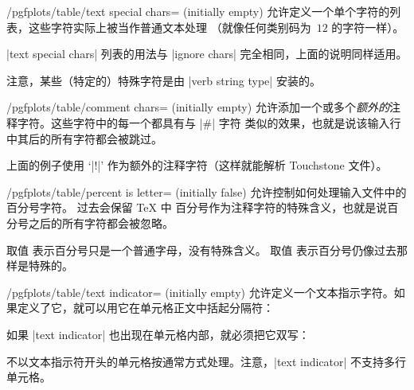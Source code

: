 \documentclass[a4paper,doc2]{ltxdoc}
\begin{document}
\begin{key}{/pgfplots/table/text special chars= (initially empty)}
    允许定义一个单个字符的列表，这些字符实际上被当作普通文本处理
    （就像任何类别码为~$12$ 的字符一样）。

    |text special chars| 列表的用法与 |ignore chars| 完全相同，上面的说明同样适用。

    注意，某些（特定的）特殊字符是由 |verb string type| 安装的。
\begin{codeexample}[]
\end{codeexample}
\end{key}

\begin{key}{/pgfplots/table/comment chars= (initially empty)}
    允许添加一个或多个\emph{额外的}注释字符。这些字符中的每一个都具有与 |#| 字符
    类似的效果，也就是说该输入行中其后的所有字符都会被跳过。
\begin{codeexample}[]
\end{codeexample}
    上面的例子使用 `|!|' 作为额外的注释字符（这样就能解析 Touchstone 文件）。
\end{key}

\begin{key}{/pgfplots/table/percent is letter= (initially false)}
    允许控制如何处理输入文件中的百分号字符。\PGFPlotstable{} 过去会保留 \TeX{} 中
    百分号作为注释字符的特殊含义，也就是说百分号之后的所有字符都会被忽略。

    取值  表示百分号只是一个普通字母，没有特殊含义。
    取值  表示百分号仍像过去那样是特殊的。
\end{key}

\begin{key}{/pgfplots/table/text indicator= (initially empty)}
    允许定义一个文本指示字符。如果定义了它，就可以用它在单元格正文中括起分隔符：
\begin{codeexample}[]
\end{codeexample}

    如果 |text indicator| 也出现在单元格内部，就必须把它双写：
\begin{codeexample}[]
\end{codeexample}

    不以文本指示符开头的单元格按通常方式处理。注意，|text indicator| 不支持多行单元格。
\end{key}
\end{document}
